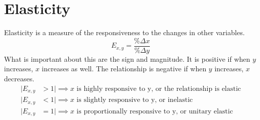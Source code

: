 \documentclass[nobib]{tufte-handout}
\begin{document}
\section{Elasticity}
Elasticity is a measure of the responsiveness to the changes in other
variables.
\begin{equation*}
    E_{x,y} = \frac{\%\Delta x}{\%\Delta y}
\end{equation*}
What is important about this are the sign and magnitude. It is positive if when $y$ increases, $x$ increases as well. The relationship is negative if when $y$ increases, $x$ decreases.\\
\begin{align*}
    |E_{x,y} & >1| \implies x \text{ is highly responsive to y, or the relationship is elastic} \\
    |E_{x,y} & <1| \implies x \text{ is slightly responsive to y, or inelastic}                 \\
    |E_{x,y} & =1| \implies x \text{ is proportionally responsive to y, or unitary elastic}
\end{align*}
\end{document}
